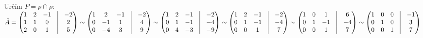   Určím $P = p\cap\rho$:
   $ \bar{A} = \begin{pmatrix}
	   1 &2 &-1 &\vline& -2 \\ 
	   1 &1 &0 &\vline& 2 \\ 
	   2 &0 &1 &\vline& 5 \\ 
   \end{pmatrix}
   \sim
   \begin{pmatrix}
	   1 &2 &-1 &\vline& -2 \\ 
	   0 &-1 &1 &\vline& 4 \\ 
	   0 &-4 &3 &\vline& 9 \\ 
   \end{pmatrix}
   \sim
   \begin{pmatrix}
	   1 &2 &-1 &\vline& -2 \\ 
	   0 &1 &-1 &\vline& -4 \\ 
	   0 &4 &-3 &\vline& -9 \\ 
   \end{pmatrix}
   \sim
   \begin{pmatrix}
	   1 &2 &-1 &\vline& -2 \\ 
	   0 &1 &-1 &\vline& -4 \\ 
	   0 &0 &1 &\vline& 7 \\ 
   \end{pmatrix}
   \sim
   \begin{pmatrix}
	   1 &0 &1 &\vline& 6 \\ 
	   0 &1 &-1 &\vline& -4 \\ 
	   0 &0 &1 &\vline& 7 \\ 
   \end{pmatrix}
   \sim
   \begin{pmatrix}
	   1 &0 &0 &\vline& -1 \\ 
	   0 &1 &0 &\vline& 3 \\ 
	   0 &0 &1 &\vline& 7 \\ 
   \end{pmatrix}
    $ 


